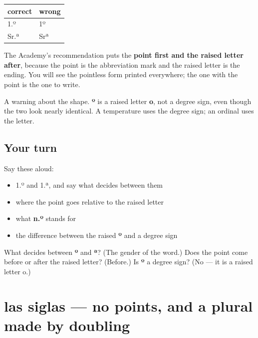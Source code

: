 \begin{grammarlens}[title={Grammar Lens: the point goes before the raised letter}]
\noindent
\begin{tabularx}{\linewidth}{@{}>{\raggedright\arraybackslash}X>{\raggedright\arraybackslash}X@{}}
\toprule
\textbf{correct} & \textbf{wrong} \\
\midrule
1.º & 1º \\
Sr.ª & Srª \\
\bottomrule
\end{tabularx}

The Academy's recommendation puts the \textbf{point first and the raised letter after}, because the point is the abbreviation mark and the raised letter is the ending. You will see the pointless form printed everywhere; the one with the point is the one to write.

A warning about the shape. \textbf{º} is a raised letter \textbf{o}, not a degree sign, even though the two look nearly identical. A temperature uses the degree sign; an ordinal uses the letter.
\end{grammarlens}

\subsection*{Your turn}
Say these aloud:

\begin{itemize}
\raggedright
  \item 1.º and 1.ª, and say what decides between them
  \item where the point goes relative to the raised letter
  \item what \textbf{n.º} stands for
  \item the difference between the raised \textbf{º} and a degree sign
\end{itemize}

\begin{tcolorbox}[breakable,colback=teal!4,colframe=teal!35!black,title={Before you move on}]
What decides between \textbf{º} and \textbf{ª}? (The gender of the word.) Does the point come before or after the raised letter? (Before.) Is \textbf{º} a degree sign? (No — it is a raised letter o.)
\end{tcolorbox}
\section[las siglas]{las siglas — no points, and a plural made by doubling}

